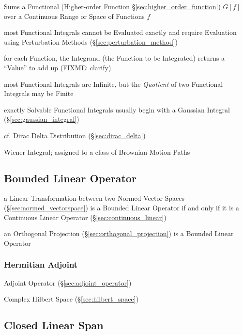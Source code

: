 Sums a Functional (Higher-order Function \S\ref{sec:higher_order_function})
$G[f]$ over a Continuous Range or Space of Functions $f$

most Functional Integrals cannot be Evaluated exactly and require Evaluation
using Perturbation Methods (\S\ref{sec:perturbation_method})

for each Function, the Integrand (the Function to be Integrated) returns a
``Value'' to add up (FIXME: clarify)

most Functional Integrals are Infinite, but the \emph{Quotient} of two
Functional Integrals may be Finite

exactly Solvable Functional Integrals usually begin with a Gaussian Integral
(\S\ref{sec:gaussian_integral})

cf. Dirac Delta Distribution (\S\ref{sec:dirac_delta})

Wiener Integral; assigned to a class of Brownian Motion Paths



\subsection{Bounded Linear Operator}\label{sec:bounded_linear_operator}

a Linear Transformation between two Normed Vector Spaces
(\S\ref{sec:normed_vectorspace}) is a Bounded Linear Operator if and
only if it is a Continuous Linear Operator
(\S\ref{sec:continuous_linear})

an Orthogonal Projection (\S\ref{sec:orthogonal_projection}) is a Bounded
Linear Operator



\subsubsection{Hermitian Adjoint}\label{sec:hermitian_adjoint}

Adjoint Operator (\S\ref{sec:adjoint_operator})

Complex Hilbert Space (\S\ref{sec:hilbert_space})



\subsection{Closed Linear Span}\label{sec:closed_linear_span}

